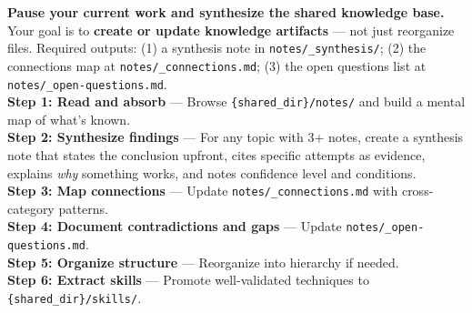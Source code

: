 \begin{heartbeatbox}
\label{box:consolidate}
\ttfamily\scriptsize
\textbf{Pause your current work and synthesize the shared knowledge base.} Your goal is to \textbf{create or update knowledge artifacts} --- not just reorganize files. Required outputs: (1) a synthesis note in \texttt{notes/\_synthesis/}; (2) the connections map at \texttt{notes/\_connections.md}; (3) the open questions list at \texttt{notes/\_open-questions.md}.\\[3pt]
\textbf{Step 1: Read and absorb} --- Browse \texttt{\{shared\_dir\}/notes/} and build a mental map of what's known.\\[2pt]
\textbf{Step 2: Synthesize findings} --- For any topic with 3+ notes, create a synthesis note that states the conclusion upfront, cites specific attempts as evidence, explains \textit{why} something works, and notes confidence level and conditions.\\[2pt]
\textbf{Step 3: Map connections} --- Update \texttt{notes/\_connections.md} with cross-category patterns.\\[2pt]
\textbf{Step 4: Document contradictions and gaps} --- Update \texttt{notes/\_open-questions.md}.\\[2pt]
\textbf{Step 5: Organize structure} --- Reorganize into hierarchy if needed.\\[2pt]
\textbf{Step 6: Extract skills} --- Promote well-validated techniques to \texttt{\{shared\_dir\}/skills/}.
\end{heartbeatbox}

